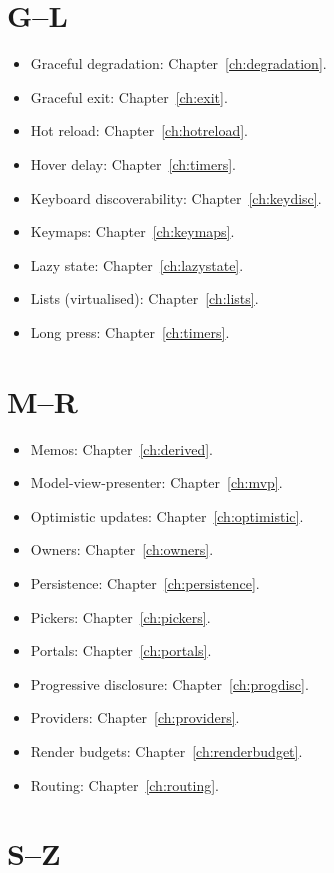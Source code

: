 \section{G--L}

\begin{itemize}[leftmargin=*]
  \item Graceful degradation:
    Chapter~\ref{ch:degradation}.
  \item Graceful exit: Chapter~\ref{ch:exit}.
  \item Hot reload: Chapter~\ref{ch:hotreload}.
  \item Hover delay: Chapter~\ref{ch:timers}.
  \item Keyboard discoverability:
    Chapter~\ref{ch:keydisc}.
  \item Keymaps: Chapter~\ref{ch:keymaps}.
  \item Lazy state: Chapter~\ref{ch:lazystate}.
  \item Lists (virtualised): Chapter~\ref{ch:lists}.
  \item Long press: Chapter~\ref{ch:timers}.
\end{itemize}

\section{M--R}

\begin{itemize}[leftmargin=*]
  \item Memos: Chapter~\ref{ch:derived}.
  \item Model-view-presenter: Chapter~\ref{ch:mvp}.
  \item Optimistic updates: Chapter~\ref{ch:optimistic}.
  \item Owners: Chapter~\ref{ch:owners}.
  \item Persistence: Chapter~\ref{ch:persistence}.
  \item Pickers: Chapter~\ref{ch:pickers}.
  \item Portals: Chapter~\ref{ch:portals}.
  \item Progressive disclosure:
    Chapter~\ref{ch:progdisc}.
  \item Providers: Chapter~\ref{ch:providers}.
  \item Render budgets: Chapter~\ref{ch:renderbudget}.
  \item Routing: Chapter~\ref{ch:routing}.
\end{itemize}

\section{S--Z}


